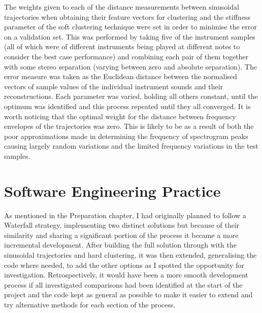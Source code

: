 \documentclass[10pt,twoside,a4paper]{report}
\begin{document}
The weights given to each of the distance measurements between sinusoidal trajectories when obtaining their feature vectors for clustering and the stiffness parameter of the soft clustering technique were set in order to minimise the error on a validation set. This was performed by taking five of the instrument samples (all of which were of different instruments being played at different notes to consider the best case performance) and combining each pair of them together with some stereo separation (varying between zero and absolute separation). The error measure was taken as the Euclidean distance between the normalised vectors of sample values of the individual instrument sounds and their reconstructions. Each parameter was varied, holding all others constant, until the optimum was identified and this process repeated until they all converged. It is worth noticing that the optimal weight for the distance between frequency envelopes of the trajectories was zero. This is likely to be as a result of both the poor approximations made in determining the frequency of spectrogram peaks causing largely random variations and the limited frequency variations in the test samples.





\section{Software Engineering Practice}

As mentioned in the Preparation chapter, I had originally planned to follow a Waterfall strategy, implementing two distinct solutions but because of their similarity and sharing a significant portion of the process it became a more incremental development. After building the full solution through with the sinusoidal trajectories and hard clustering, it was then extended, generalising the code where needed, to add the other options as I spotted the opportunity for investigation. Retrospectively, it would have been a more smooth development process if all investigated comparisons had been identified at the start of the project and the code kept as general as possible to make it easier to extend and try alternative methods for each section of the process.
\end{document}
